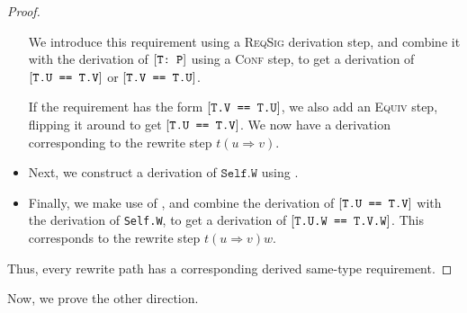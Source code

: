 \documentclass[../generics]{subfiles}
\begin{document}
\begin{proof}
\begin{itemize}
We introduce this requirement using a \textsc{ReqSig} derivation step, and combine it with the derivation of $[\texttt{T:~P}]$ using a \textsc{Conf} step, to get a derivation of $[\texttt{T.U == T.V}]$ or $[\texttt{T.V == T.U}]$.

If the requirement has the form $[\texttt{T.V == T.U}]$, we also add an \textsc{Equiv} step, flipping it around to get $[\texttt{T.U == T.V}]$. We now have a derivation corresponding to the rewrite step $t(u\Rightarrow v)$.

\item Next, we construct a derivation of $\texttt{Self.W}$  using .
\item Finally, we make use of , and combine the derivation of $[\texttt{T.U == T.V}]$ with the derivation of \texttt{Self.W}, to get a derivation of $[\texttt{T.U.W == T.V.W}]$. This corresponds to the rewrite step $t(u\Rightarrow v)w$.
\end{itemize}
Thus, every rewrite path has a corresponding derived same-type requirement.
\end{proof}

Now, we prove the other direction.
\end{document}
